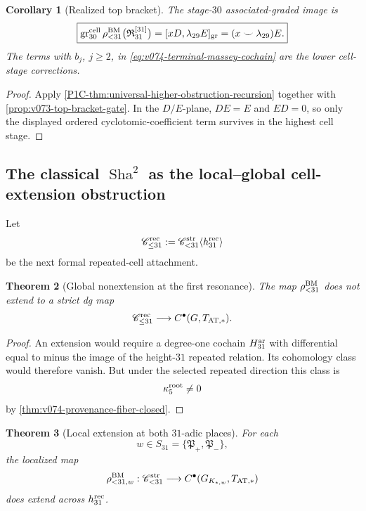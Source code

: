 \documentclass[11pt]{article}
\newtheorem{theorem}{Theorem}[section]
\newtheorem{corollary}[theorem]{Corollary}
\theoremstyle{remark}
\providecommand{\Sha}{\operatorname{Sha}}
\begin{document}
\begin{corollary}[Realized top bracket]
\label{cor:v074-realized-top-bracket}
The stage-\(30\) associated-graded image is
\begin{equation}
 \boxed{
 \operatorname{gr}_{30}^{\rm cell}
 \rho_{<31}^{\rm BM}
 \bigl(\mathfrak R_{31}^{[31]}\bigr)
 =
 [xD,\lambda_{29}E]_{\rm gr}
 =
 (x\smile\lambda_{29})E.}
 \label{eq:v074-realized-top-bracket}
\end{equation}
The terms with \(b_j\), \(j\ge2\), in
\eqref{eq:v074-terminal-massey-cochain} are the lower cell-stage
corrections.
\end{corollary}

\begin{proof}
Apply \cref{P1C-thm:universal-higher-obstruction-recursion} together with
\cref{prop:v073-top-bracket-gate}.
In the \(D/E\)-plane, \(DE=E\) and \(ED=0\), so only the displayed ordered
cyclotomic-coefficient term survives in the highest cell stage.
\end{proof}

\subsection{The classical \texorpdfstring{\(\Sha^2\)}{Sha2} as the local--global cell-extension
obstruction}

Let
\[
 \mathscr C_{\le31}^{\rm rec}
 :=
 \mathscr C_{<31}^{\rm str}
 \langle h_{31}^{\rm rec}\rangle
\]
be the next formal repeated-cell attachment.

\begin{theorem}[Global nonextension at the first resonance]
\label{thm:v074-global-nonextension}
The map \(\rho_{<31}^{\rm BM}\) does not extend to a strict dg map
\[
 \mathscr C_{\le31}^{\rm rec}
 \longrightarrow
 C^\bullet(G,T_{\rm AT,*}).
\]
\end{theorem}

\begin{proof}
An extension would require a degree-one cochain
\(H_{31}^{\rm ar}\) with differential equal to minus the image of the
height-\(31\) repeated relation.  Its cohomology class would therefore
vanish.  But under the selected repeated direction this class is
\[
 \kappa_5^{\rm root}\ne0
\]
by \cref{thm:v074-provenance-fiber-closed}.
\end{proof}

\begin{theorem}[Local extension at both \(31\)-adic places]
\label{thm:v074-local-extension}
For each
\[
 w\in S_{31}=\{\mathfrak P_+,\mathfrak P_-\},
\]
the localized map
\[
 \rho_{<31,w}^{\rm BM}:
 \mathscr C_{<31}^{\rm str}
 \longrightarrow
 C^\bullet(G_{K_{*,w}},T_{\rm AT,*})
\]
does extend across \(h_{31}^{\rm rec}\).
\end{theorem}
\end{document}
